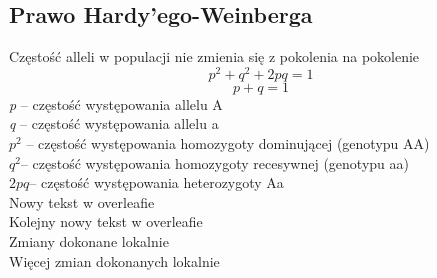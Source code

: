 \begin{flushleft}
\subsection{Prawo Hardy’ego-Weinberga }
 Częstość alleli w populacji nie zmienia się z pokolenia na pokolenie
\[p^2 + q^2 +2pq =1\]
\[p + q = 1\]
\textit{p} – częstość występowania allelu A\\
\textit{q} – częstość występowania allelu a\\
$p^2$ – częstość występowania homozygoty dominującej (genotypu AA)\\
$q^2$– częstość występowania homozygoty recesywnej (genotypu aa)\\
$2pq$– częstość występowania heterozygoty Aa\\

Nowy tekst w overleafie\\
Kolejny nowy tekst w overleafie\\
Zmiany dokonane lokalnie\\
Więcej zmian dokonanych lokalnie
\end{flushleft}
